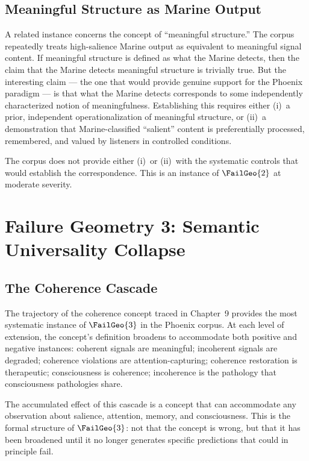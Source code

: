 \subsection{Meaningful Structure as Marine Output}

A related instance concerns the concept of ``meaningful
structure.'' The corpus repeatedly treats high-salience
Marine output as equivalent to meaningful signal content.
If meaningful structure is defined as what the Marine
detects, then the claim that the Marine detects meaningful
structure is trivially true. But the interesting claim
--- the one that would provide genuine support for
the Phoenix paradigm --- is that what the Marine detects
corresponds to some independently characterized notion
of meaningfulness. Establishing this requires either
(i)~a prior, independent operationalization of meaningful
structure, or (ii)~a demonstration that Marine-classified
``salient'' content is preferentially processed, remembered,
and valued by listeners in controlled conditions.

The corpus does not provide either (i)~or (ii)~with
the systematic controls that would establish the
correspondence. This is an instance of $\FailGeo{2}$
at moderate severity.

\section{Failure Geometry 3: Semantic Universality Collapse}
\label{sec:fg3-analysis}

\subsection{The Coherence Cascade}

The trajectory of the coherence concept traced in Chapter~9
provides the most systematic instance of $\FailGeo{3}$
in the Phoenix corpus. At each level of extension, the
concept's definition broadens to accommodate both positive
and negative instances: coherent signals are meaningful;
incoherent signals are degraded; coherence violations
are attention-capturing; coherence restoration is
therapeutic; consciousness is coherence; incoherence
is the pathology that consciousness pathologies share.

The accumulated effect of this cascade is a concept
that can accommodate any observation about salience,
attention, memory, and consciousness. This is the formal
structure of $\FailGeo{3}$: not that the concept is
wrong, but that it has been broadened until it no longer
generates specific predictions that could in principle
fail.

